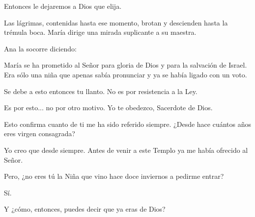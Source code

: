 \documentclass[12pt, twoside, openright]{book} %
\begin{document}
Entonces le dejaremos a Dios que elija. 

Las lágrimas, contenidas hasta ese momento, brotan y descienden hasta la trémula boca. María dirige una mirada suplicante a su maestra. 

Ana la socorre diciendo: 

María se ha prometido al Señor para gloria de Dios y para la salvación de Israel. Era sólo una niña que apenas sabía pronunciar y ya se había ligado con un voto. 

Se debe a esto entonces tu llanto. No es por resistencia a la Ley. 

Es por esto... no por otro motivo. Yo te obedezco, Sacerdote de Dios. 

Esto confirma cuanto de ti me ha sido referido siempre. ¿Desde hace cuántos años eres virgen consagrada? 

Yo creo que desde siempre. Antes de venir a este Templo ya me había ofrecido al Señor. 

Pero, ¿no eres tú la Niña que vino hace doce inviernos a pedirme entrar? 

Sí. 

Y ¿cómo, entonces, puedes decir que ya eras de Dios? 
\end{document}
